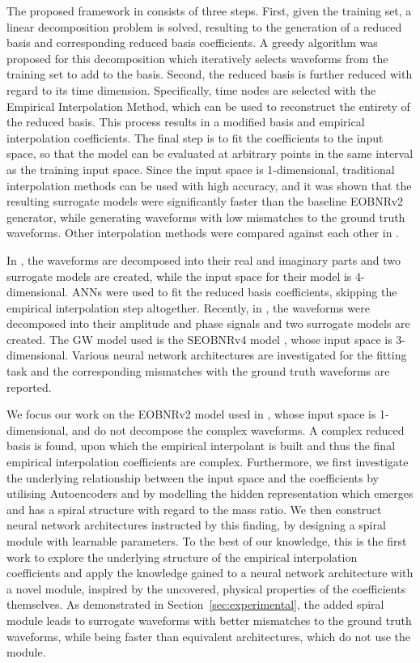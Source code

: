 \documentclass[preprint,12pt]{elsarticle}
\begin{document}
The proposed framework in \cite{field2014fast} consists of three steps. First, given the training set, a linear decomposition problem is solved, resulting to the generation of a reduced basis and corresponding reduced basis coefficients. A greedy algorithm was proposed for this decomposition which iteratively selects waveforms from the training set to add to the basis. Second, the reduced basis is further reduced with regard to its time dimension. Specifically, time nodes are selected with the Empirical Interpolation Method, which can be used to reconstruct the entirety of the reduced basis. This process results in a modified basis and empirical interpolation coefficients. The final step is to fit the coefficients to the input space, so that the model can be evaluated at arbitrary points in the same interval as the training input space. Since the input space is 1-dimensional, traditional interpolation methods can be used with high accuracy, and it was shown that the resulting surrogate models were significantly faster than the baseline EOBNRv2 generator, while generating waveforms with low mismatches to the ground truth waveforms. Other interpolation methods were compared against each other in \cite{setyawati2020regression}.

In \cite{chua2019reduced}, the waveforms are decomposed into their real and imaginary parts and two surrogate models are created, while the input space for their model is 4-dimensional. ANNs were used to fit the reduced basis coefficients, skipping the empirical interpolation step altogether. Recently, in \cite{khan2021gravitational}, the waveforms were decomposed into their amplitude and phase signals and two surrogate models are created. The GW model used is the SEOBNRv4 model \cite{sonoda2017neural}, whose input space is 3-dimensional. Various neural network architectures are investigated for the fitting task and the corresponding mismatches with the ground truth waveforms are reported. 

We focus our work on the EOBNRv2 model used in \cite{field2014fast}, whose input space is 1-dimensional, and do not decompose the complex waveforms. A complex reduced basis is found, upon which the empirical interpolant is built and thus the final empirical interpolation coefficients are complex. Furthermore, we first investigate the underlying relationship between the input space and the coefficients by utilising Autoencoders \cite{nousi2017deep,nousi2018self} and by modelling the hidden representation which emerges and has a spiral structure with regard to the mass ratio. We then construct neural network architectures instructed by this finding, by designing a spiral module with learnable parameters. To the best of our knowledge, this is the first work to explore the underlying structure of the empirical interpolation coefficients and apply the knowledge gained to a neural network architecture with a novel module, inspired by the uncovered, physical properties of the coefficients themselves. As demonstrated in Section~\ref{sec:experimental}, the added spiral module leads to surrogate waveforms with better mismatches to the ground truth waveforms, while being faster than equivalent architectures, which do not use the module.
\end{document}
